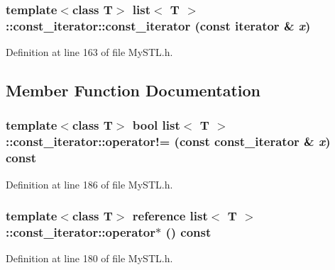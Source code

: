 \subsubsection[{const\_\-iterator}]{\setlength{\rightskip}{0pt plus 5cm}template$<$class T$>$ {\bf list}$<$ T $>$::const\_\-iterator::const\_\-iterator (const {\bf iterator} \& {\em x})}\label{classlist_1_1const__iterator_a8741a68b72d63996e9cd0ccb23dbe43b}


Definition at line 163 of file MySTL.h.



\subsection{Member Function Documentation}
\subsubsection[{operator!=}]{\setlength{\rightskip}{0pt plus 5cm}template$<$class T$>$ bool {\bf list}$<$ T $>$::const\_\-iterator::operator!= (const {\bf const\_\-iterator} \& {\em x}) const}\label{classlist_1_1const__iterator_a2721e2a07de7925c37bd91bf43b4485d}


Definition at line 186 of file MySTL.h.

\subsubsection[{operator$\ast$}]{\setlength{\rightskip}{0pt plus 5cm}template$<$class T$>$ {\bf reference} {\bf list}$<$ T $>$::const\_\-iterator::operator$\ast$ () const}\label{classlist_1_1const__iterator_a3df22c2ff30372d1a9c3f5188843c4f7}


Definition at line 180 of file MySTL.h.

